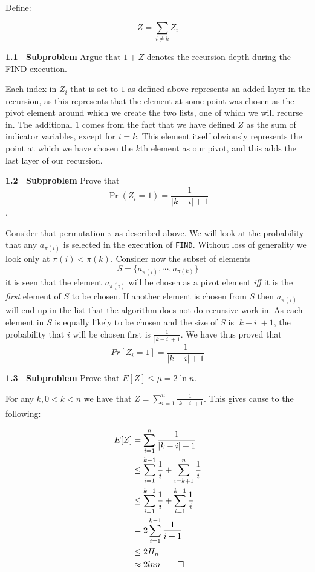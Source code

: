 \documentclass[article,a4paper,oneside]{article}
\newcommand{\+}[1]{\ensuremath{\boldsymbol{#1}}}
\begin{document}
Define:

$$Z=\sum_{i\neq k} Z_i$$

{\bf 1.1 \ Subproblem} Argue that $1+Z$ denotes the recursion depth
during the FIND execution.

Each index in $Z_i$ that is set to $1$ as defined above represents an added layer in the recursion, as this represents that the element at some point was chosen as the pivot element around which we create the two lists, one of which we will recurse in. The additional $1$ comes from the fact that we have defined $Z$ as the sum of indicator variables, except for $i=k$. This element itself obviously represents the point at which we have chosen the $k$th element as our pivot, and this adds the last layer of our recursion.
\par

{\bf 1.2 \ Subproblem} Prove that $$\Pr(Z_{i}=1)=\frac{1}{|k-i|+1}$$.

Consider that permutation $\pi$ as described above. We will look at the probability that any $a_{\pi(i)}$ is selected in the execution of \texttt{FIND}. Without loss of generality we look only at $\pi(i) < \pi(k)$. Consider now the subset of elements $$S = \lbrace a_{\pi(i)},\cdots,a_{\pi(k)}\rbrace$$ it is seen that the element $a_{\pi(i)}$ will be chosen as a pivot element \emph{iff} it is the \emph{first} element of $S$ to be chosen. If another element is chosen from $S$ then $a_{\pi(i)}$ will end up in the list that the algorithm does not do recursive work in. As each element in $S$ is equally likely to be chosen and the size of $S$ is $|k - i| + 1$, the probability that $i$ will be chosen first is $\frac{1}{|k-i |+1}$. We have thus proved that $$Pr[Z_{i} = 1] = \frac{1}{|k-i|+1}$$

{\bf 1.3 \ Subproblem} Prove that $E[Z]\leq \mu = 2 \ln n$.

For any $k, 0<k<n$ we have that $Z = \sum_{i=1}^{n} \frac{1}{|k-i|+1}$.
This gives cause to the following:

\begin{align*}
E[Z] &= \sum_{i=1}^{n} \frac{1}{|k-i|+1}
\\ &\leq \sum_{i=1}^{k-1} \frac{1}{i} + \sum_{i=k+1}^{n} \frac{1}{i}
\\ &\leq \sum_{i=1}^{k-1} \frac{1}{i} + \sum_{i=1}^{k-1} \frac{1}{i}
\\ &= 2\sum_{i=1}^{k-1} \frac{1}{i+1}
\\ &\leq 2H_n
\\ &\approx 2lnn \qedhere
\end{align*}
\end{document}

